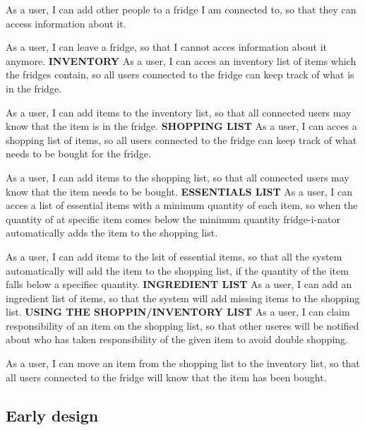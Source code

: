 As a user, I can add other people to a fridge I am connected to, so that they can access information about it.

As a user, I can leave a fridge, so that I cannot acces information about it anymore.
\newline
\newline
\textbf{INVENTORY}
As a user, I can acces an inventory list of items which the fridges contain, so all users connected to the fridge can keep track of what is in the fridge.

As a user, I can add items to the inventory list, so that all connected users may know that the item is in the fridge.
\newline
\newline
\textbf{SHOPPING LIST}
As a user, I can acces a shopping list of items, so all users connected to the fridge can keep track of what needs to be bought for the fridge.

As a user, I can add items to the shopping list, so that all connected users may know that the item needs to be bought.
\newline
\newline
\textbf{ESSENTIALS LIST}
As a user, I can acces a list of essential items with a minimum quantity of each item, so when the quantity of at specific item comes below the minimum quantity fridge-i-nator automatically adds the item to the shopping list.

As a user, I can add items to the lsit of essential items, so that all the system automatically will add the item to the shopping list, if the quantity of the item falls below a specifiec quantity.
\newline
\newline
\textbf{INGREDIENT LIST}
As a user, I can add an ingredient list of items, so that the system will add missing items to the shopping list.
\newline
\newline
\textbf{USING THE SHOPPIN/INVENTORY LIST}
As a user, I can claim responsibility of an item on the shopping list, so that other useres will be notified about who has taken responsibility of the given item to avoid double shopping.

As a user, I can move an item from the shopping list to the inventory list, so that all users connected to the fridge will know that the item has been bought.


\subsection{Early design}

